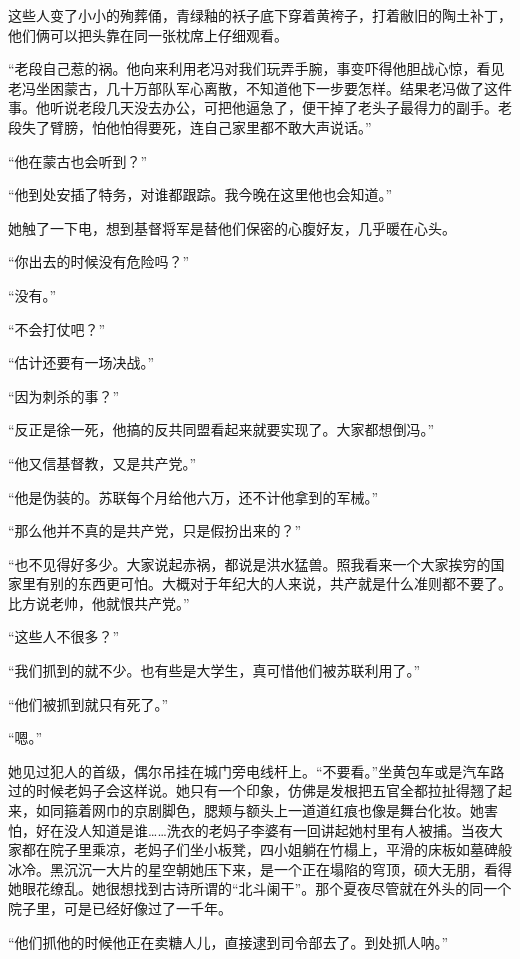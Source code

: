 \par 这些人变了小小的殉葬俑，青绿釉的袄子底下穿着黄袴子，打着敝旧的陶土补丁，他们俩可以把头靠在同一张枕席上仔细观看。
\par “老段自己惹的祸。他向来利用老冯对我们玩弄手腕，事变吓得他胆战心惊，看见老冯坐困蒙古，几十万部队军心离散，不知道他下一步要怎样。结果老冯做了这件事。他听说老段几天没去办公，可把他逼急了，便干掉了老头子最得力的副手。老段失了臂膀，怕他怕得要死，连自己家里都不敢大声说话。”
\par “他在蒙古也会听到？”
\par “他到处安插了特务，对谁都跟踪。我今晚在这里他也会知道。”
\par 她触了一下电，想到基督将军是替他们保密的心腹好友，几乎暖在心头。
\par “你出去的时候没有危险吗？”
\par “没有。”
\par “不会打仗吧？”
\par “估计还要有一场决战。”
\par “因为刺杀的事？”
\par “反正是徐一死，他搞的反共同盟看起来就要实现了。大家都想倒冯。”
\par “他又信基督教，又是共产党。”
\par “他是伪装的。苏联每个月给他六万，还不计他拿到的军械。”
\par “那么他并不真的是共产党，只是假扮出来的？”
\par “也不见得好多少。大家说起赤祸，都说是洪水猛兽。照我看来一个大家挨穷的国家里有别的东西更可怕。大概对于年纪大的人来说，共产就是什么准则都不要了。比方说老帅，他就恨共产党。”
\par “这些人不很多？”
\par “我们抓到的就不少。也有些是大学生，真可惜他们被苏联利用了。”
\par “他们被抓到就只有死了。”
\par “嗯。”
\par 她见过犯人的首级，偶尔吊挂在城门旁电线杆上。“不要看。”坐黄包车或是汽车路过的时候老妈子会这样说。她只有一个印象，仿佛是发根把五官全都拉扯得翘了起来，如同箍着网巾的京剧脚色，腮颊与额头上一道道红痕也像是舞台化妆。她害怕，好在没人知道是谁……洗衣的老妈子李婆有一回讲起她村里有人被捕。当夜大家都在院子里乘凉，老妈子们坐小板凳，四小姐躺在竹榻上，平滑的床板如墓碑般冰冷。黑沉沉一大片的星空朝她压下来，是一个正在塌陷的穹顶，硕大无朋，看得她眼花缭乱。她很想找到古诗所谓的“北斗阑干”。那个夏夜尽管就在外头的同一个院子里，可是已经好像过了一千年。
\par “他们抓他的时候他正在卖糖人儿，直接逮到司令部去了。到处抓人呐。”
